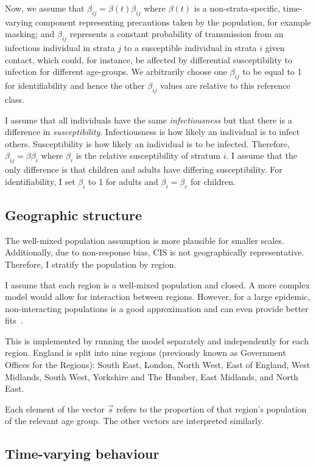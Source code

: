 \documentclass[thesis.tex]{subfiles}
\begin{document}
Now, we assume that $\beta_{ij} = \beta(t) \beta_{ij}$ where $\beta(t)$ is a non-strata-specific, time-varying component representing precautions taken by the population, for example masking; and $\beta_{ij}$ represents a constant probability of transmission from an infectious individual in strata $j$ to a susceptible individual in strata $i$ given contact, which could, for instance, be affected by differential susceptibility to infection for different age-groups.
We arbitrarily choose one $\beta_{ij}$ to be equal to 1 for identifiability and hence the other $\beta_{ij}$ values are relative to this reference class.

I assume that all individuals have the same \emph{infectiousness} but that there is a difference in \emph{susceptibility}.
Infectiousness is how likely an individual is to infect others.
Susceptibility is how likely an individual is to be infected.
Therefore, $\beta_{ij} = \beta \beta_i$ where $\beta_i$ is the relative susceptibility of stratum $i$.
I assume that the only difference is that children and adults have differing susceptibility.
For identifiability, I set $\beta_i$ to 1 for adults and $\beta_i = \beta_c$ for children.

\subsection{Geographic structure}

The well-mixed population assumption is more plausible for smaller scales.
Additionally, due to non-response bias, CIS is not geographically representative.
Therefore, I stratify the population by region.

I assume that each region is a well-mixed population and closed.
A more complex model would allow for interaction between regions.
However, for a large epidemic, non-interacting populations is a good approximation and can even provide better fits~\autocite{birrellRealtimea}.

This is implemented by running the model separately and independently for each region.
England is split into nine regions (previously known as Government Offices for the Regions): South East, London, North West, East of England, West Midlands, South West, Yorkshire and The Humber, East Midlands, and North East.

Each element of the vector $\vec{s}$ refers to the proportion of that region's population of the relevant age group.
The other vectors are interpreted similarly.

\subsection{Time-varying behaviour} \label{SEIR:sec:time-varying-foi}
\end{document}
